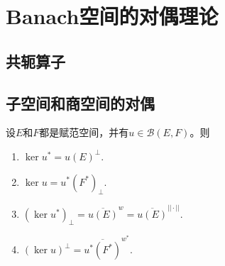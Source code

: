 \section{Banach空间的对偶理论}
\subsection{共轭算子}

\subsection{子空间和商空间的对偶}

\begin{theorem}
    设$E$和$F$都是赋范空间，并有$u\in \mathcal{B}(E,F)$。则
    \begin{enumerate}
        \item $\ker u^{*}=u(E)^{\perp}$.
        \item $\ker u=u^{*}(F^{*})_{\perp}$.
        \item $(\ker u^{*})_{\perp}=\overline{u(E)}^{w}=\overline{u(E)}^{||\cdot||}$.
        \item $(\ker u)^{\perp}=\overline{u^{*}(F^{*})}^{w^{*}}$.
    \end{enumerate}
\end{theorem}